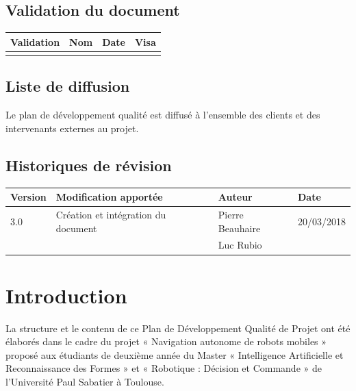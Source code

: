 \documentclass[10pt,a4paper]{article}
\begin{document}
\subsection*{Validation du document}

\begin{center}
    \begin{tabular}{| l | l | l | l |}
    \hline
     \rowcolor{gray} Validation & Nom & Date & Visa \\ \hline
    & & & \\
     \hline
    \end{tabular}
\end{center}

\subsection*{Liste de diffusion}

Le plan de développement qualité est diffusé à l'ensemble des clients et des intervenants externes au projet.

\subsection*{Historiques de révision}

\begin{center}
    \begin{tabular}{| l | l | l | l |}
    \hline
     \rowcolor{gray} Version & Modification apportée & Auteur & Date \\ \hline
    3.0 & Création et intégration du document & Pierre Beauhaire & 20/03/2018\\
     & & Luc Rubio & \\
     \hline
     
    \end{tabular}
\end{center}

\newpage
\tableofcontents
\newpage
	

\section{Introduction}
\label{sec:introduction}

La structure et le contenu de ce Plan de Développement Qualité de Projet ont été élaborés dans le cadre du projet « Navigation autonome de robots mobiles » proposé aux étudiants de deuxième année du Master « Intelligence Artificielle et Reconnaissance des Formes » et « Robotique : Décision et Commande » de l'Université Paul Sabatier à Toulouse.
\end{document}
